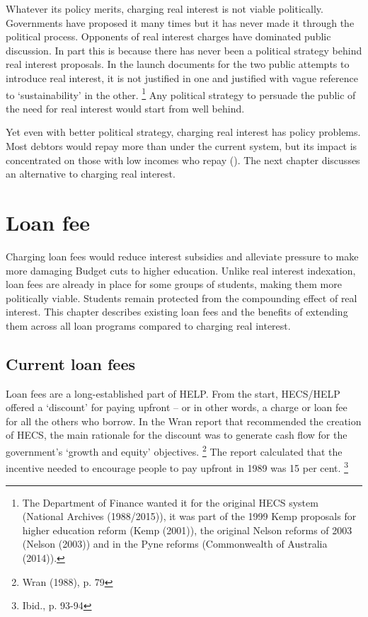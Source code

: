 \documentclass[embargoed]{grattan}
\begin{document}
{Whatever its policy merits, charging real interest is not viable politically.
Governments have proposed it many times but it has never made it through the political process.
Opponents of real interest charges have dominated public discussion.
In part this is because there has never been a political strategy behind real interest proposals.
In the launch documents for the two public attempts to introduce real interest, it is not justified in one and justified with vague reference to `sustainability' in the other.%
\footnote{The Department of Finance wanted it for the original \gls{HECS} system (National Archives (1988/2015)), it was part of the 1999 Kemp proposals for higher education reform (Kemp (2001)), the original Nelson reforms of 2003 (Nelson (2003)) and in the Pyne reforms (Commonwealth of Australia (2014)).} Any political strategy to persuade the public of the need for real interest would start from well behind.

Yet even with better political strategy, charging real interest has policy problems.
Most debtors would repay more than under the current system, but its impact is concentrated on those with low incomes who repay ().
The next chapter discusses an alternative to charging real interest.

\chapter{Loan fee}\label{chap:6-loan-fee}

Charging loan fees would reduce interest subsidies and alleviate pressure to make more damaging Budget cuts to higher education.
Unlike real interest indexation, loan fees are already in place for some groups of students, making them more politically viable.
Students remain protected from the compounding effect of real interest.
This chapter describes existing loan fees and the benefits of extending them across all loan programs compared to charging real interest.

\section{Current loan fees}\label{sec:current-loan-fees}

Loan fees are a long-established part of \gls{HELP}.
From the start, \gls{HECS}/\gls{HELP} offered a `discount' for paying upfront -- or in other words, a charge or loan fee for all the others who borrow.
In the Wran report that recommended the creation of \gls{HECS}, the main rationale for the discount was to generate cash flow for the government's `growth and equity' objectives.%
\footnote{Wran (1988), p. 79} The report calculated that the incentive needed to encourage people to pay upfront in 1989 was 15 per cent.%
\footnote{Ibid., p. 93-94}

}
\end{document}
